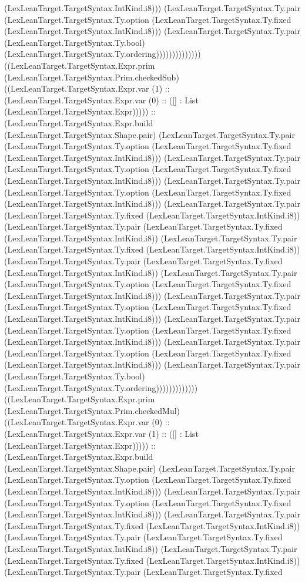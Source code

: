 \documentclass[11pt]{article}
\begin{document}
(LexLeanTarget.TargetSyntax.IntKind.i8))) (LexLeanTarget.TargetSyntax.Ty.pair (LexLeanTarget.TargetSyntax.Ty.option (LexLeanTarget.TargetSyntax.Ty.fixed (LexLeanTarget.TargetSyntax.IntKind.i8))) (LexLeanTarget.TargetSyntax.Ty.pair (LexLeanTarget.TargetSyntax.Ty.bool) (LexLeanTarget.TargetSyntax.Ty.ordering)))))))))))))) ((LexLeanTarget.TargetSyntax.Expr.prim (LexLeanTarget.TargetSyntax.Prim.checkedSub) ((LexLeanTarget.TargetSyntax.Expr.var (1) :: (LexLeanTarget.TargetSyntax.Expr.var (0) :: ([] : List (LexLeanTarget.TargetSyntax.Expr))))) :: (LexLeanTarget.TargetSyntax.Expr.build (LexLeanTarget.TargetSyntax.Shape.pair) (LexLeanTarget.TargetSyntax.Ty.pair (LexLeanTarget.TargetSyntax.Ty.option (LexLeanTarget.TargetSyntax.Ty.fixed (LexLeanTarget.TargetSyntax.IntKind.i8))) (LexLeanTarget.TargetSyntax.Ty.pair (LexLeanTarget.TargetSyntax.Ty.option (LexLeanTarget.TargetSyntax.Ty.fixed (LexLeanTarget.TargetSyntax.IntKind.i8))) (LexLeanTarget.TargetSyntax.Ty.pair (LexLeanTarget.TargetSyntax.Ty.option (LexLeanTarget.TargetSyntax.Ty.fixed (LexLeanTarget.TargetSyntax.IntKind.i8))) (LexLeanTarget.TargetSyntax.Ty.pair (LexLeanTarget.TargetSyntax.Ty.fixed (LexLeanTarget.TargetSyntax.IntKind.i8)) (LexLeanTarget.TargetSyntax.Ty.pair (LexLeanTarget.TargetSyntax.Ty.fixed (LexLeanTarget.TargetSyntax.IntKind.i8)) (LexLeanTarget.TargetSyntax.Ty.pair (LexLeanTarget.TargetSyntax.Ty.fixed (LexLeanTarget.TargetSyntax.IntKind.i8)) (LexLeanTarget.TargetSyntax.Ty.pair (LexLeanTarget.TargetSyntax.Ty.fixed (LexLeanTarget.TargetSyntax.IntKind.i8)) (LexLeanTarget.TargetSyntax.Ty.pair (LexLeanTarget.TargetSyntax.Ty.option (LexLeanTarget.TargetSyntax.Ty.fixed (LexLeanTarget.TargetSyntax.IntKind.i8))) (LexLeanTarget.TargetSyntax.Ty.pair (LexLeanTarget.TargetSyntax.Ty.option (LexLeanTarget.TargetSyntax.Ty.fixed (LexLeanTarget.TargetSyntax.IntKind.i8))) (LexLeanTarget.TargetSyntax.Ty.pair (LexLeanTarget.TargetSyntax.Ty.option (LexLeanTarget.TargetSyntax.Ty.fixed (LexLeanTarget.TargetSyntax.IntKind.i8))) (LexLeanTarget.TargetSyntax.Ty.pair (LexLeanTarget.TargetSyntax.Ty.option (LexLeanTarget.TargetSyntax.Ty.fixed (LexLeanTarget.TargetSyntax.IntKind.i8))) (LexLeanTarget.TargetSyntax.Ty.pair (LexLeanTarget.TargetSyntax.Ty.bool) (LexLeanTarget.TargetSyntax.Ty.ordering))))))))))))) ((LexLeanTarget.TargetSyntax.Expr.prim (LexLeanTarget.TargetSyntax.Prim.checkedMul) ((LexLeanTarget.TargetSyntax.Expr.var (0) :: (LexLeanTarget.TargetSyntax.Expr.var (1) :: ([] : List (LexLeanTarget.TargetSyntax.Expr))))) :: (LexLeanTarget.TargetSyntax.Expr.build (LexLeanTarget.TargetSyntax.Shape.pair) (LexLeanTarget.TargetSyntax.Ty.pair (LexLeanTarget.TargetSyntax.Ty.option (LexLeanTarget.TargetSyntax.Ty.fixed (LexLeanTarget.TargetSyntax.IntKind.i8))) (LexLeanTarget.TargetSyntax.Ty.pair (LexLeanTarget.TargetSyntax.Ty.option (LexLeanTarget.TargetSyntax.Ty.fixed (LexLeanTarget.TargetSyntax.IntKind.i8))) (LexLeanTarget.TargetSyntax.Ty.pair (LexLeanTarget.TargetSyntax.Ty.fixed (LexLeanTarget.TargetSyntax.IntKind.i8)) (LexLeanTarget.TargetSyntax.Ty.pair (LexLeanTarget.TargetSyntax.Ty.fixed (LexLeanTarget.TargetSyntax.IntKind.i8)) (LexLeanTarget.TargetSyntax.Ty.pair (LexLeanTarget.TargetSyntax.Ty.fixed (LexLeanTarget.TargetSyntax.IntKind.i8)) (LexLeanTarget.TargetSyntax.Ty.pair (LexLeanTarget.TargetSyntax.Ty.fixed 
\end{document}

